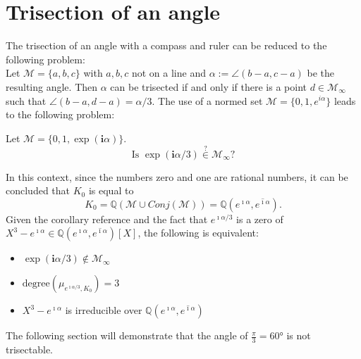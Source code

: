 \section{Trisection of an angle}
The trisection of an angle with a compass and ruler can be reduced to the following problem:\\
Let $\mathcal{M} = \{a, b, c\}$ with $a, b, c$ not on a line and $\alpha := \angle (b - a, c - a)$ be the resulting angle.
Then $\alpha$ can be trisected if and only if there is a point $d\in \mathcal{M}_{\infty}$ such that $\angle (b - a, d - a) = \alpha/3$. 
The use of a normed set $\mathcal{M} = \{0,1,e^{i\alpha}\}$ leads to the following problem:
\begin{problem}
    Let $\mathcal{M} = \{0,1,\exp(\textbf{i} \alpha)\}$. $$\text{Is }\exp(\textbf{i} \alpha/3) \overset{?}{\in} \mathcal{M}_{\infty}?$$
\end{problem}
In this context, since the numbers zero and one are rational numbers, it can be concluded that $K_0$ is equal to
$$ K_0 = \mathbb{Q}(\mathcal{M}\cup Conj(\mathcal{M})) = \mathbb{Q}(e^{\imath\alpha},\overline{e^{\imath\alpha}}). $$
Given the corollary reference and the fact that $e^{\imath\alpha/3}$ is a zero of $X^3 - e^{\imath\alpha}\in \mathbb{Q}(e^{\imath\alpha},\overline{e^{\imath\alpha}})[X]$, the following is  equivalent: 
\begin{itemize}
    \item $\exp(\textbf{i} \alpha/3) \notin \mathcal{M}_{\infty}$
    \item $\text{degree}(\mu_{e^{\imath\alpha/3},K_0}) = 3$
    \item $X^3 - e^{\imath\alpha}$ is irreducible over $\mathbb{Q}(e^{\imath\alpha},\overline{e^{\imath\alpha}})$
\end{itemize}
The following section will demonstrate that the angle of $\frac{\pi}{3}=60°$  is not trisectable.

